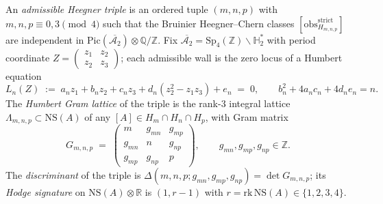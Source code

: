 \begin{definition}
\label{def:admissible-heegner-triple}
%
%
An \emph{admissible Heegner triple} is an ordered tuple
$(m,n,p)$ with $m,n,p\equiv 0,3\pmod 4$ such that the Bruinier
Heegner--Chern classes $[\mathrm{obs}^{\mathrm{strict}}_{H_{m,n,p}}]$
are independent in
$\mathrm{Pic}(\overline{\mathcal A_2})\otimes\mathbb Q/\mathbb Z$. Fix
$\overline{\mathcal A_2}=\mathrm{Sp}_4(\mathbb Z)\backslash\mathbb
H_2^*$ with period coordinate
$Z=\begin{pmatrix}z_1&z_2\\ z_2&z_3\end{pmatrix}$; each admissible
wall is the zero locus of a Humbert equation
\[
L_n(Z)\;:=\;a_n z_1 + b_n z_2 + c_n z_3 + d_n(z_2^2-z_1 z_3) + e_n
\;=\;0,
\qquad b_n^2+4a_nc_n+4d_ne_n=n.
\]
The \emph{Humbert Gram lattice} of the triple is the rank-$3$
integral lattice $\Lambda_{m,n,p}\subset\mathrm{NS}(A)$ of any
$[A]\in H_m\cap H_n\cap H_p$, with Gram matrix
\[
G_{m,n,p}\;=\;
\begin{pmatrix}
m & g_{mn} & g_{mp}\\
g_{mn} & n & g_{np}\\
g_{mp} & g_{np} & p
\end{pmatrix},
\qquad g_{mn},g_{mp},g_{np}\in\mathbb Z.
\]
The \emph{discriminant} of the triple is
$\Delta(m,n,p;g_{mn},g_{mp},g_{np})=\det G_{m,n,p}$; its
\emph{Hodge signature} on $\mathrm{NS}(A)\otimes\mathbb R$ is
$(1,r-1)$ with $r=\mathrm{rk}\,\mathrm{NS}(A)\in\{1,2,3,4\}$.
\end{definition}

